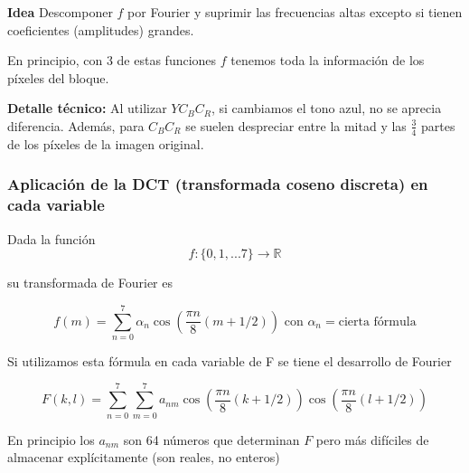 		\textbf{Idea} Descomponer $f$ por Fourier y suprimir las frecuencias altas excepto si tienen coeficientes (amplitudes) grandes.



		En principio, con 3 de estas funciones $f$ tenemos toda la información de los píxeles del bloque.

		\textbf{Detalle técnico:} Al utilizar $Y C_B C_R$, si cambiamos el tono azul, no se aprecia diferencia. Además, para $C_B C_R$ se suelen despreciar entre la mitad y las $\frac{3}{4}$ partes de los píxeles de la imagen original.


		\subsubsection{Aplicación de la DCT (transformada coseno discreta) en cada variable}

			Dada la función
			\[f: \{ 0,1,...7 \} \rightarrow \mathbb{R}\]

			su transformada de Fourier es

			$$ f(m) = \sum\limits^{7}_{n=0} \alpha_n \cos \left(\frac{\pi n}{8} (m + 1/2) \right) \text{ con } \alpha_n = \text{cierta fórmula} $$

			Si utilizamos esta fórmula en cada variable de F se tiene el desarrollo de Fourier

			$$ F(k,l) = \sum\limits^{7}_{n = 0} \sum\limits^{7}_{m = 0} a_{nm} \cos \left( \frac{\pi n}{8} (k+1/2)  \right) \cos \left( \frac{\pi n}{8} (l+1/2)  \right) $$


			En principio los $a_{nm}$ son 64 números que determinan $F$ pero más difíciles de almacenar explícitamente (son reales, no enteros)


